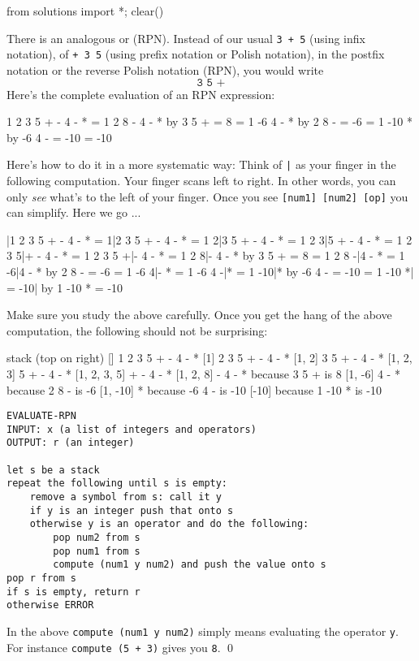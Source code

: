 \begin{python0}
from solutions import *; clear()
\end{python0}

There is an analogous
 or
\sidebarskip{8pt}
 (RPN).
Instead of our usual \verb!3 + 5! (using infix notation),
of \verb!+ 3 5! (using prefix notation or Polish notation),
in the postfix notation or the reverse Polish notation (RPN), you would write
\[
\texttt{3 5 +}
\]
Here's the complete evaluation of an RPN expression: 
\begin{console}
  1 2 3 5 + - 4 - *
= 1 2 8 - 4 - *       by 3 5 + = 8
= 1 -6 4 - *          by 2 8 - = -6
= 1 -10 *             by -6 4 - = -10
= -10
\end{console}

Here's how to do it in a more systematic way:
Think of \verb!|! as your finger in the following computation.
Your finger scans left to right. In other words, you can only \textit{see}
what's to the left of your finger.
Once you see \verb![num1] [num2] [op]! you can simplify.
Here we go ...
\begin{console}
  |1 2 3 5 + - 4 - *
=  1|2 3 5 + - 4 - *
=  1 2|3 5 + - 4 - *
=  1 2 3|5 + - 4 - *
=  1 2 3 5|+ - 4 - *
=  1 2 3 5 +|- 4 - *
=  1 2 8|- 4 - *        by 3 5 + = 8
=  1 2 8 -|4 - *        
=  1 -6|4 - *           by 2 8 - = -6
=  1 -6 4|- *
=  1 -6 4 -|*
=  1 -10|*              by -6 4 - = -10
=  1 -10 *|
=  -10|                 by 1 -10 * = -10
\end{console}
Make sure you study the above carefully.
Once you get the hang of the above computation,
the following should not be surprising:
\begin{console}          
stack (top on right)                       
[]                 1 2 3 5 + - 4 - *
[1]                  2 3 5 + - 4 - *
[1, 2]                 3 5 + - 4 - *      
[1, 2, 3]                5 + - 4 - *
[1, 2, 3, 5]               + - 4 - *
[1, 2, 8]                    - 4 - *   because 3 5 + is 8
[1, -6]                        4 - *   because 2 8 - is -6
[1, -10]                           *   because -6 4 - is -10
[-10]                                  because 1 -10 * is -10
\end{console}

\begin{Verbatim}[frame=single]
EVALUATE-RPN
INPUT: x (a list of integers and operators)
OUTPUT: r (an integer)

let s be a stack
repeat the following until s is empty:
    remove a symbol from s: call it y
    if y is an integer push that onto s
    otherwise y is an operator and do the following:
        pop num2 from s
        pop num1 from s
        compute (num1 y num2) and push the value onto s
pop r from s
if s is empty, return r
otherwise ERROR
\end{Verbatim}
In the above \texttt{compute (num1 y num2)}
simply means evaluating the operator
\texttt{y}.
For instance
\texttt{compute (5 + 3)} gives you \texttt{8}.
\qed



